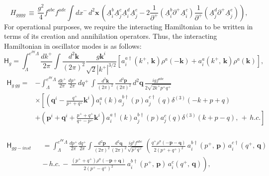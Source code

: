 \documentclass[10pt]{article}
\numberwithin{equation}{section}
\begin{document}
 \begin{equation}H_{gggg}\,\equiv\,\frac{g^{2}}{4}f^{abc}f^{ade}\int dx^{-}\, d^{2}\mathbf{x}\,\left(\underline{A}_{i}^{b}\underline{A}_{j}^{c}\underline{A}_{i}^{d}\underline{A}_{j}^{e}-2\frac{1}{\partial^{+}}(\underline{A}_{i}^{b}\partial^{+}\underline{A}_{i}^{c})\frac{1}{\partial^{+}}(\underline{A}_{j}^{d}\partial^{+}\underline{A}_{j}^{e})\right),
 \end{equation}
For operational purposes, we require the interacting Hamiltonian to be written in terms of its creation and annihilation operators. Thus, the interacting Hamiltonian in oscillator modes is as follows:
 \begin{equation}\label{eikohg}
\mathsf{H}_{g}=\int_{\Lambda}^{e^{\delta\mathsf{Y}}\Lambda}\frac{dk^{+}}{2\pi}\int\frac{d^{2}\mathbf{k}}{(2\pi)^{2}}\frac{g\mathbf{k}^{i}}{\sqrt{2}|k^{+}|^{3/2}}\left[a_{i}^{a\dagger}(k^{+},\, \mathbf{k})\rho^{a}(-\mathbf{k})+a_{i}^{a}(k^{+},\, \mathbf{k})\rho^{a}(\mathbf{k})\right],
 \end{equation}
 \begin{equation}\begin{split}
\mathsf{H}_{g\: gg}=&-\int_{\Lambda}^{e^{\delta\mathsf{Y}}\Lambda}\frac{dk^{+}}{2\pi}\,\frac{dp^{+}}{2\pi}\, dq^{+}\,\int\frac{d^{2}\mathbf{k}}{(2\pi)^{2}}\,\frac{d^{2}\mathbf{p}}{(2\pi)^{2}}\, d^{2}\mathbf{q}\,\frac{igf^{abc}}{2\sqrt{2k^{+}p^{+}q^{+}}}\\
&\times\left[\left(\mathbf{q}^{i}-\frac{q^{+}}{p^{+}+q^{+}}\mathbf{k}^{i}\right)a_{i}^{a}(k)a_{j}^{b\dagger}(p)a_{j}^{c\dagger}(q)\delta^{(3)}(-k+p+q)\right.\\
&+\left.\left(\mathbf{p}^{i}+\mathbf{q}^{i}+\frac{p^{+}+q^{+}}{q^{+}-p^{+}}\mathbf{k}^{i}\right)a_{i}^{a\dagger}(k)a_{j}^{b\dagger}(p)a_{j}^{c}(q)\delta^{(3)}(k+p-q),\,+\,h.c.\right]\\
 \end{split}\end{equation}

    \begin{eqnarray}
\mathsf{H}_{gg-inst}&&=\int_{\Lambda}^{e^{\delta\mathsf{Y}}\Lambda}\frac{dp^{+}}{2\pi}\frac{dq^{+}}{2\pi}\int\frac{d^{2}\mathbf{p}}{(2\pi)^{2}}\frac{d^{2}\mathbf{q}}{(2\pi)^{2}}\frac{ig^{2}f^{abc}}{\sqrt{p^{+}q^{+}}}\,\left(\frac{q^{+}\rho^{a}(-\mathbf{p}-\mathbf{q})}{2(p^{+}+q^{+})^{2}}\, a_{i}^{b\dagger}(p^{+},\,\mathbf{p})\, a_{i}^{c\dagger}(q^{+},\,\mathbf{q})\right.\nonumber\\
&&\left.-\, h.c.\,-\,\frac{(p^{+}+q^{+})\rho^{a}(-\mathbf{p}+\mathbf{q})}{2(p^{+}-q^{+})^{2}}\, a_{i}^{b\dagger}(p^{+},\,\mathbf{p})\, a_{i}^{c}(q^{+},\,\mathbf{q})\right),\end{eqnarray}
\end{document}
